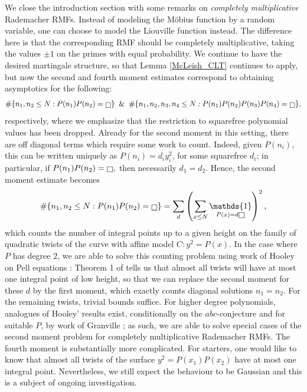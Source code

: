 \documentclass[11pts]{amsart}
\numberwithin{equation}{section}
\DeclareMathOperator{\one}{\mathds{1}}
\let\oldsquare\square
\renewcommand{\square}[1][-1pt]{%
 {\raisebox{#1}{$\oldsquare$}}%
}
\begin{document}
We close the introduction section with some remarks on \textit{completely multiplicative} Rademacher RMFs. Instead of modeling the M{\"o}bius function by a random variable, one can choose to model the Liouville function instead. The difference here is that the corresponding RMF should be completely multiplicative, taking the values $\pm 1$ on the primes with equal probability. We continue to have the desired martingale structure, so that Lemma \ref{McLeish_CLT} continues to apply, but now the second and fourth moment estimates correspond to obtaining asymptotics for the following:
\begin{align*}
\#\{n_1,n_2\leq N: P(n_1)P(n_2)=\square\}\;\;\&\;\;\#\{n_1,n_2,n_3,n_4\leq N: P(n_1)P(n_2)P(n_3)P(n_4)=\square\},
\end{align*}
respectively, where we emphasize that the restriction to squarefree polynomial values has been dropped. Already for the second moment in this setting, there are off diagonal terms which require some work to count. Indeed, given $P(n_i)$, this can be written uniquely as $P(n_i)=d_iy_i^2$, for some squarefree $d_i$; in particular, if $P(n_1)P(n_2)=\square,$ then necessarily $d_1=d_2$. Hence, the second moment estimate becomes
\begin{align*}
\#\{n_1,n_2\leq N: P(n_1)P(n_2)=\square\}
=
\sum_d \left(\sum_{x\leq N}\one_{P(x)=d\square}\right)^2,
\end{align*}
which counts the number of integral points up to a given height on the family of quadratic twists of the curve with affine model $C:y^2=P(x)$. In the case where $P$ has degree $2$, we are able to solve this counting problem using work of Hooley on Pell equations \cite{Hooley-Pell}: Theorem 1 of \cite{Hooley-Pell} tells us that almost all twists will have at most one integral point of low height, so that we can replace the second moment for these $d$ by the first moment, which exactly counts diagonal solutions $n_1=n_2$. For the remaining twists, trivial bounds suffice. For higher degree polynomials, analogues of Hooley' results exist, conditionally on the $abc$-conjecture and for suitable $P$, by work of Granville \cite[Theorem 4 (i)]{Granville-twists}; as such, we are able to solve special cases of the second moment problem for completely multiplicative Rademacher RMFs. The fourth moment is substantially more complicated. For starters, one would like to know that almost all twists of the surface $y^2=P(x_1)P(x_2)$ have at most one integral point. Nevertheless, we still expect the behaviour to be Gaussian and this is a subject of ongoing investigation.
\end{document}
